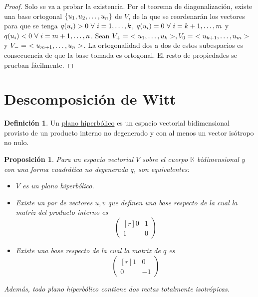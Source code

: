 \documentclass[12pt]{report}
\newtheorem{proposition}{Proposición}[chapter]
\theoremstyle{definition}
\newtheorem{definition}{Definición}[chapter]
\theoremstyle{definition}
\theoremstyle{remark}
\begin{document}
\begin{proof}
Solo se va a probar la existencia. Por el teorema de diagonalización, existe una base ortogonal $\{u_1,u_2,\mathellipsis,u_n\}$ de $V$, de la que se reordenarán los vectores para que se tenga $q(u_i) > 0 \ \forall \ i = 1,\mathellipsis,k$, $q(u_i)=0 \ \forall \ i = k+1,\mathellipsis,m$ y $q(u_i) < 0 \ \forall \ i = m+1,\mathellipsis,n$. Sean $V_+ = \ <u_1,\mathellipsis,u_k>, V_0 = \ <u_{k+1},\mathellipsis,u_m>$ y $V_- = \ <u_{m+1},\mathellipsis,u_n>$. La ortogonalidad dos a dos de estos subespacios es consecuencia de que la base tomada es ortogonal. El resto de propiedades se prueban fácilmente.
\end{proof}

\section{Descomposición de Witt}

\begin{definition}
Un \ul{plano hiperbólico} es un espacio vectorial bidimensional provisto de un producto interno no degenerado y con al menos un vector isótropo no nulo.
\end{definition}

\begin{proposition}
\label{prop4.4.}
Para un espacio vectorial $V$ sobre el cuerpo $\mathbb{K}$ bidimensional y con una forma cuadrática no degenerada $q$, son equivalentes:
\begin{itemize}
    \item[(i)] $V$ es un plano hiperbólico.
    \item[(ii)] Existe un par de vectores $u,v$ que definen una base respecto de la cual la matriz del producto interno es
    \[\begin{pmatrix*}[r]
        0 & 1 \\
        1 & 0
    \end{pmatrix*}\]
    \item[(iii)] Existe una base respecto de la cual la matriz de $q$ es
    \[\begin{pmatrix*}[r]
        1 & 0 \\
        0 & -1
    \end{pmatrix*}
    \]
\end{itemize}
Además, todo plano hiperbólico contiene dos rectas totalmente isotrópicas.
\end{proposition}
\end{document}
